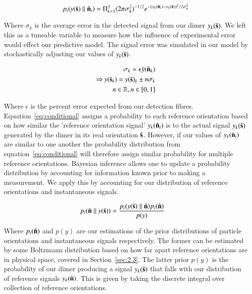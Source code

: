 \documentclass[final, 3p]{elsarticle}
\begin{document}
\begin{align}
	\label{eq:conditional}
	p_i(y(\bar{\bf s})\parallel\hat{\bf n}_i) = \Pi^3_{k=1}
	(2\pi\sigma_k^2)^{-1/2} 
	e^{-(y_{k}(\hat{\bf n}_i)-y_{k}(\bar{\bf s}))^2/2\sigma_k^2}
\end{align}

Where $\sigma_k$ is the average error in the detected signal from our dimer $y_k(\bar{\bf s})$. We left this as a tuneable variable to measure how the influence of experimental error would effect our predictive model. The signal error was simulated in our model by stochastically adjusting our values of $y_k(\bar{\bf s})$. 

\begin{eqnarray*}
	\sigma_k = \epsilon\bar{y}(\hat{\bf n}_k) \\
	\Rightarrow y(\bar{\bf s}_k) = y(\bar{\bf s})_k \pm n\sigma_k \\ 
	n \in \mathbb{R}, n\in[0,1]
\end{eqnarray*} 

Where $\epsilon$ is the percent error expected from our detection fibres. Equation~\eqref{eq:conditional} assigns a probability to each reference orientation based on how similar the 'reference orientation signal' $y_{k}(\hat{\bf n}_i)$ is to the actual signal $y_{k}(\bar{\bf s})$ generated by the dimer in its real orientation $\bar{\bf s}$. However, if our values of $y_k(\hat{\bf n}_i)$ are similar to one another the probability distribution from equation~\ref{eq:conditional} will therefore assign similar probability for multiple reference orientations. Bayesian inference allows one to update a probability distribution by accounting for information known prior to making a measurement. We apply this by accounting for our distribution of reference orientations and instantaneous signals.  

\begin{align}
	\label{eq:bayes}
	p_i(\hat{\bf n}\parallel y(\bar{\bf s}))&= \frac{p_i(y(\bar{\bf s})\parallel\hat{\bf n})p_i(\hat{\bf n})}{p(y)}
\end{align}

Where $p_i(\hat{\bf n})$ and $p(y)$ are our estimations of the prior distributions of particle orientations and instantaneous signals respectively. The former can be estimated by some Boltzmann distribution based on how far apart reference orientations are in physical space, covered in Section~\ref{sec:2.3}. The latter prior $p(y)$ is the probability of our dimer producing a signal $y_k(\bar{\bf s})$ that falls with our distribution of reference signals $y_k(\hat{\bf n})$. This is given by taking the discrete integral over collection of reference orientations. 
\end{document}
